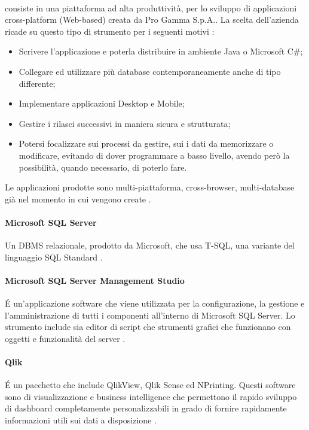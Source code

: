 \paragraph{\inde} consiste in una piattaforma ad alta produttività, per lo sviluppo di applicazioni cross-platform (Web-based) creata da Pro Gamma S.p.A.. La scelta dell'azienda ricade su questo tipo di strumento per i seguenti motivi \hyperref[bib1]{\cite{[1]}}:
\begin{itemize}
	\item Scrivere l'applicazione e poterla distribuire in ambiente Java o Microsoft C\#;
	\item Collegare ed utilizzare più database contemporaneamente anche di tipo differente;
	\item Implementare applicazioni Desktop e Mobile;
	\item Gestire i rilasci successivi in maniera sicura e strutturata;
	\item Potersi focalizzare sui processi da gestire, sui i dati da memorizzare o modificare, evitando di dover programmare a basso livello, avendo però la possibilità, quando necessario, di poterlo fare.
\end{itemize}
Le applicazioni prodotte sono multi-piattaforma, cross-browser, multi-database già nel momento in cui vengono create \hyperref[bib1]{\cite{[1]}}.

\paragraph{Microsoft SQL Server} Un DBMS relazionale, prodotto da Microsoft, che usa T-SQL, una variante del linguaggio SQL Standard \hyperref[bib7]{\cite{[7]}}. 

\paragraph{Microsoft SQL Server Management Studio} \'E un'applicazione software che viene utilizzata per la configurazione, la gestione e l'amministrazione di tutti i componenti all'interno di Microsoft SQL Server. Lo strumento include sia editor di script che strumenti grafici che funzionano con oggetti e funzionalità del server \hyperref[bib8]{\cite{[8]}}.

\paragraph{Qlik}\'E un pacchetto che include QlikView, Qlik Sense ed NPrinting. Questi software sono di visualizzazione e business intelligence che permettono il rapido sviluppo di dashboard completamente personalizzabili in grado di fornire rapidamente informazioni utili sui dati a disposizione \hyperref[bib9]{\cite{[9]}}.

